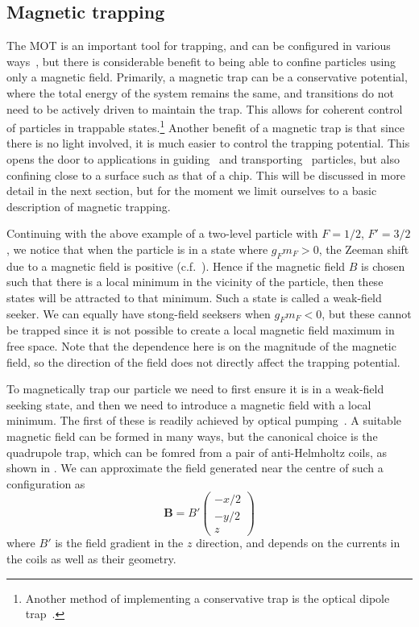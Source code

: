 \subsection{Magnetic trapping}
\label{theory:magtraps}

The MOT is an important tool for trapping, and can be configured in various
ways~\cite{Cotter2016, Lee:96, PhysRevLett.59.2631}, but there is considerable
benefit to being able to confine particles using only a magnetic field.
%
Primarily, a magnetic trap can be a conservative potential, where the total
energy of the system remains the same, and transitions do not need to be
actively driven to maintain the trap. This allows for coherent control of
particles in trappable states.\footnote{Another method of implementing a
  conservative trap is the optical dipole trap~\cite{Foot2005}.}
%
Another benefit of a magnetic trap is that since there is no light involved, it
is much easier to control the trapping potential. This opens the door to
applications in guiding~\cite{PhysRevLett.83.5194} and
transporting~\cite{Nakagawa2005} particles, but also confining close to a
surface such as that of a chip. This will be discussed in more detail in the
next section, but for the moment we limit ourselves to a basic description of
magnetic trapping.

Continuing with the above example of a two-level particle with $F=1/2$,
$F'=3/2$, we notice that when the particle is in a state where $g_F m_F > 0$,
the Zeeman shift due to a magnetic field is positive (c.f.\
). Hence if the magnetic field $B$ is chosen such
that there is a local minimum in the vicinity of the particle, then these
states will be attracted to that minimum. Such a state is called a weak-field
seeker. We can equally have stong-field seeksers when $g_F m_F < 0$, but these
cannot be trapped since it is not possible to create a local magnetic field
maximum in free space.
%
Note that the dependence here is on the magnitude of the magnetic field, so the
direction of the field does not directly affect the trapping potential.

To magnetically trap our particle we need to first ensure it is in a weak-field
seeking state, and then we need to introduce a magnetic field with a local
minimum. The first of these is readily achieved by optical
pumping~\cite{PhysRevLett.54.2596}.  A suitable magnetic field can be formed in
many ways, but the canonical choice is the quadrupole trap, which can be fomred
from a pair of anti-Helmholtz coils, as shown in
. We can approximate the field generated near
the centre of such a configuration as~\cite{Metcalf1999}
%
\begin{equation}
  \mathbf{B} = B'\begin{pmatrix} -x/2 \\ -y/2 \\ z \end{pmatrix}
  \label{theory:eqn:quadrupole}
\end{equation}
%
where $B'$ is the field gradient in the $z$ direction, and depends on the
currents in the coils as well as their geometry.

